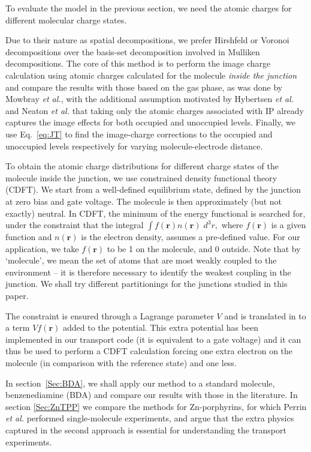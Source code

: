 \documentclass[aip,jcp,a4paper,reprint,floatfix,superscriptaddress]{revtex4-1}
\newcommand{\etal}{\emph{et al.}\xspace}
\newcommand{\bfr}{{\bm r}}
\begin{document}
To evaluate the model in the previous section, we need the atomic charges for different molecular charge states. 

Due to their nature as spatial decompositions, we prefer Hirshfeld or Voronoi decompositions over the basis-set decomposition involved in Mulliken decompositions. The core of this method is to perform the image charge calculation using atomic charges calculated for the molecule \emph{inside the junction} and compare the results with those based on the gas phase, as was done by Mowbray \etal,\cite{Mowbray2008} with the additional assumption motivated by Hybertsen \etal\cite{Hybertsen1986} and Neaton \etal\cite{Quek2007} that taking only the atomic charges associated with IP already captures the image effects for both occupied and unoccupied levels. Finally, we use Eq.~\eqref{eq:JT} to find the image-charge corrections to the occupied and unoccupied levels 
respectively for varying molecule-electrode distance.

To obtain the atomic charge distributions for different charge states of the molecule inside the junction, we use constrained density functional theory (CDFT). 
We start from a well-defined equilibrium state, defined by the junction at zero bias and gate voltage. The molecule is then approximately (but not exactly) neutral. In CDFT, the minimum of the energy functional is searched for, under the constraint that the integral
$\int f(\bfr) n(\bfr) \; d^3 r,$
where $f(\bfr)$ is a given function and $n(\bfr)$ is the electron density, assumes a pre-defined value. For our application, we take 
$f(\bfr)$ to be 1 on the molecule, and 0 outside. Note that by `molecule', we mean the set of atoms that are most weakly coupled to the environment -- it is
therefore necessary to identify the weakest coupling in the junction.
We shall try different partitionings for the junctions studied in this paper.

The constraint is ensured through a Lagrange parameter $V$ and is translated in to a term $Vf(\bfr)$ added to the potential. This extra potential has been implemented in our transport code (it is equivalent to a gate voltage) and it can thus be used to perform a CDFT
calculation forcing one extra electron on the molecule (in comparison with the reference state) and one less. 

In section~\ref{Sec:BDA}, we shall apply our method to a standard molecule, benzenediamine (BDA) and compare our 
results with those in the literature.
In section \ref{Sec:ZnTPP} we compare the methods for Zn-porphyrins, for which Perrin \etal performed  single-molecule experiments, and argue that the extra physics captured in the second approach is essential for understanding the transport experiments.
\end{document}
